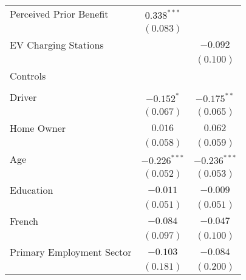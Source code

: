\begin{center}
\begin{tiny}
\begin{longtable}{l@{} c@{} c@{}}
\quad Perceived Prior Benefit                                            & $0.338^{***}$    &                \\
                                                                         & $(0.083)$        &                \\
\quad EV Charging Stations                                               &                  & $-0.092$       \\
                                                                         &                  & $(0.100)$      \\
Controls                                                                 &                  &                \\
                                                                         &                  &                \\
\quad Driver                                                             & $-0.152^{*}$     & $-0.175^{**}$  \\
                                                                         & $(0.067)$        & $(0.065)$      \\
\quad Home Owner                                                         & $0.016$          & $0.062$        \\
                                                                         & $(0.058)$        & $(0.059)$      \\
\quad Age                                                                & $-0.226^{***}$   & $-0.236^{***}$ \\
                                                                         & $(0.052)$        & $(0.053)$      \\
\quad Education                                                          & $-0.011$         & $-0.009$       \\
                                                                         & $(0.051)$        & $(0.051)$      \\
\quad French                                                             & $-0.084$         & $-0.047$       \\
                                                                         & $(0.097)$        & $(0.100)$      \\
\quad Primary Employment Sector                                          & $-0.103$         & $-0.084$       \\
                                                                         & $(0.181)$        & $(0.200)$      \\

\end{longtable}
\end{tiny}
\end{center}
